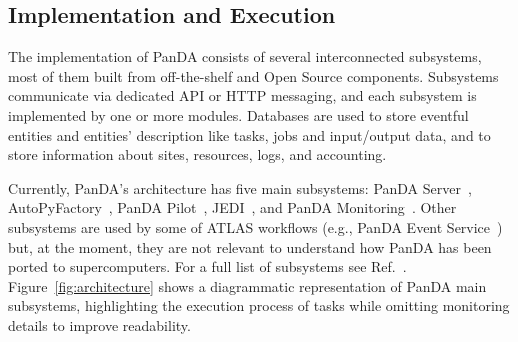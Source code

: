 \subsection{Implementation and Execution}
\label{ssec:panda_arch}


The implementation of PanDA consists of several interconnected subsystems, most
of them built from off-the-shelf and Open Source components. Subsystems
communicate via dedicated API or HTTP messaging, and each subsystem is
implemented by one or more modules. Databases are used to store eventful
entities and entities' description like tasks, jobs and %
input/output data, and to store information about sites,
resources, logs, and accounting.

Currently, PanDA's architecture has five main subsystems: PanDA
Server~\cite{maeno2011overview},
AutoPyFactory~\cite{caballero2012autopyfactory}, PanDA
Pilot~\cite{nilsson2011atlas}, JEDI~\cite{borodin2015scaling}, and PanDA
Monitoring~\cite{klimentov2011atlas}. Other subsystems are used by some of ATLAS
workflows (e.g., PanDA Event Service~\cite{calafiura2015atlas}) but, at the
moment, they are not relevant to understand how PanDA has been ported to
supercomputers. For a full list of subsystems see Ref.~\cite{panda-wiki_url}.
Figure~\ref{fig:architecture} shows a diagrammatic representation of PanDA main
subsystems, highlighting the execution process of tasks while omitting
monitoring details to improve readability.

